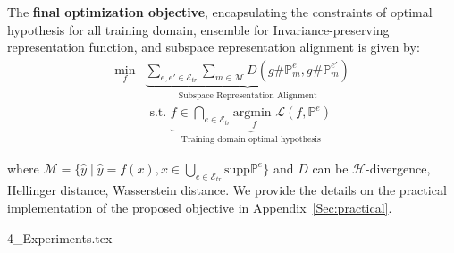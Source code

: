 The \textbf{final optimization objective}, encapsulating the constraints of optimal hypothesis for all training domain, ensemble for Invariance-preserving representation function, and subspace representation alignment is given by:
\begin{align}
\min_{f} &\underset{\text{Subspace Representation Alignment}}{\underbrace{\sum_{e,e'\in \mathcal{E}_{tr}}\sum_{m\in \mathcal{M}}D\left( g\#\mathbb{P}_m^{e},g\#\mathbb{P}_m^{e'}\right)}}\\
&\text{ s.t. } \underset{\text{Training domain optimal hypothesis}}{\underbrace{f\in \bigcap_{e\in \mathcal{E}_{tr}}\underset{ f}{\text{argmin }} \mathcal{L}\left(f,\mathbb{P}^{e}\right)}} \nonumber
\label{eq:final_objective}
\end{align}


where $\mathcal{M}=\{\hat{y}\mid \hat{y}=f(x), x\in\bigcup_{e\in\mathcal{E}_{tr}}\text{supp}\mathbb{P}^{e} \}$ and $D$ can be $\mathcal{H}$-divergence, Hellinger distance, Wasserstein distance. We provide the details on the practical implementation of the proposed objective in Appendix~\ref{Sec:practical}.

{4_Experiments.tex}